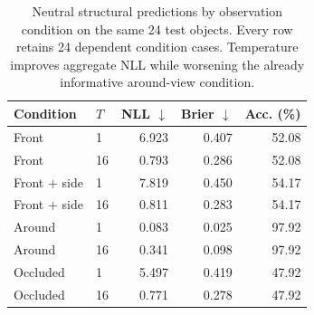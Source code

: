 \begin{table}[tbp]
\centering\small
\caption{Neutral structural predictions by observation condition on the same 24 test objects. Every row retains 24 dependent condition cases. Temperature improves aggregate NLL while worsening the already informative around-view condition.}
\label{tab:b9-structure-conditions}
\begin{tabular}{llrrr}
\toprule
Condition & $T$ & NLL $\downarrow$ & Brier $\downarrow$ & Acc. (\%) \\
\midrule
Front & 1 & 6.923 & 0.407 & 52.08 \\
Front & 16 & 0.793 & 0.286 & 52.08 \\
Front + side & 1 & 7.819 & 0.450 & 54.17 \\
Front + side & 16 & 0.811 & 0.283 & 54.17 \\
Around & 1 & 0.083 & 0.025 & 97.92 \\
Around & 16 & 0.341 & 0.098 & 97.92 \\
Occluded & 1 & 5.497 & 0.419 & 47.92 \\
Occluded & 16 & 0.771 & 0.278 & 47.92 \\
\bottomrule
\end{tabular}
\end{table}
